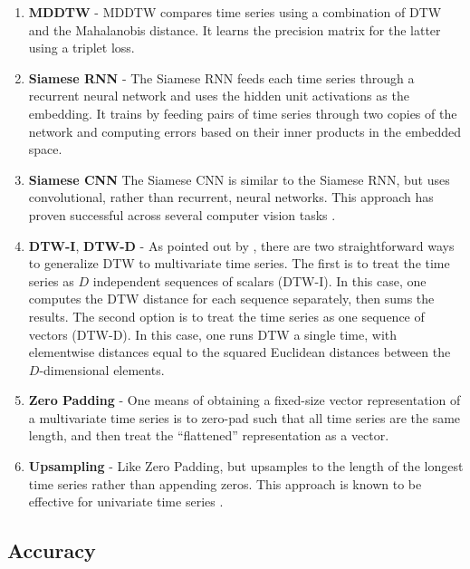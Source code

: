 \begin{enumerate}
\item \textbf{MDDTW} \citep{mddtw} - MDDTW compares time series using a combination of DTW and the Mahalanobis distance. It learns the precision matrix for the latter using a triplet loss.
\item \textbf{Siamese RNN} \citep{siameseRecurrent} - The Siamese RNN feeds each time series through a recurrent neural network and uses the hidden unit activations as the embedding. It trains by feeding pairs of time series through two copies of the network and computing errors based on their inner products in the embedded space.
\item \textbf{Siamese CNN} The Siamese CNN is similar to the Siamese RNN, but uses convolutional, rather than recurrent, neural networks. This approach has proven successful across several computer vision tasks \citep{siameseOrig,taigman2014deepface}. 
\item \textbf{DTW-I}, \textbf{DTW-D} - As pointed out by \citet{nontrivial}, there are two straightforward ways to generalize DTW to multivariate time series. The first is to treat the time series as $D$ independent sequences of scalars (DTW-I). In this case, one computes the DTW distance for each sequence separately, then sums the results. The second option is to treat the time series as one sequence of vectors (DTW-D). In this case, one runs DTW a single time, with elementwise distances equal to the squared Euclidean distances between the $D$-dimensional elements.
 \item \textbf{Zero Padding} - One means of obtaining a fixed-size vector representation of a multivariate time series is to zero-pad such that all time series are the same length, and then treat the ``flattened'' representation as a vector.
 \item \textbf{Upsampling} - Like Zero Padding, but upsamples to the length of the longest time series rather than appending zeros. This approach is known to be effective for univariate time series \citep{everythingWrongDTW}.
\end{enumerate}

\subsection{Accuracy}


